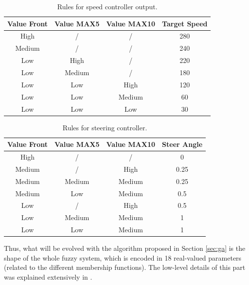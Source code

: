 \documentclass[10pt,journal,compsoc]{IEEEtran}
\begin{document}
%
\begin{table}[h!tb]
  \centering
  {\scriptsize
    \caption{Rules for speed controller output.\label{tab:output:speed}}
    \begin{tabular}{|c|c|c||c|}
\hline
      Value Front & Value MAX5 & Value MAX10 & Target Speed \\ %
      \hline
    	 High & / & / & 280 \\
      Medium & / & / & 240 \\
      Low & High & / & 220 \\
      Low & Medium & / & 180 \\
      Low & Low & High & 120 \\
      Low & Low & Medium & 60 \\           
      Low & Low & Low & 30 \\     
\hline
\hline
\end{tabular}
}
\end{table}
%
%
\begin{table}[h!tb]
  \centering
  {\scriptsize
    \caption{Rules for steering controller.\label{tab:output:steer}}
    \begin{tabular}{|c|c|c||c|}
\hline
      Value Front & Value MAX5 & Value MAX10 & Steer Angle \\
\hline
      High & / & / & 0 \\
      Medium & / & High & 0.25 \\
      Medium & Medium & Medium & 0.25 \\
      Medium & Low & Medium & 0.5 \\
      Low & / & High & 0.5 \\
      Low & Medium & Medium & 1 \\           
      Low & Low & Medium & 1 \\       
      
\hline
\end{tabular}
}
\end{table}



Thus, what will be evolved with the algorithm proposed in Section \ref{sec:ga} is the shape of the whole fuzzy system, which is encoded in 18 real-valued parameters (related to the different membership functions). The low-level details of this part was explained extensively in \cite{DBLP:conf/cig/SalemMG19}. 
\end{document}
